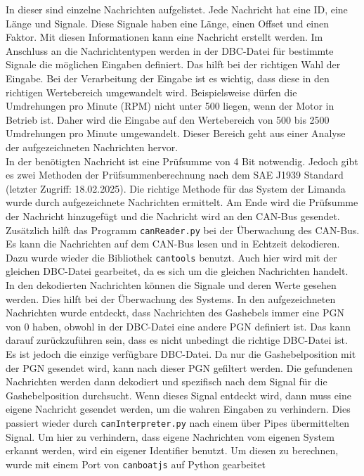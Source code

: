 In dieser sind einzelne Nachrichten aufgelistet. Jede Nachricht hat eine ID, eine Länge und Signale. Diese Signale
haben eine Länge, einen Offset und einen Faktor. Mit diesen Informationen kann eine Nachricht erstellt werden.
Im Anschluss an die Nachrichtentypen werden in der DBC-Datei für bestimmte Signale die möglichen Eingaben definiert.
Das hilft bei der richtigen Wahl der Eingabe. 
Bei der Verarbeitung der Eingabe ist es wichtig, dass diese in den richtigen Wertebereich umgewandelt wird.
Beispielsweise dürfen die Umdrehungen pro Minute (RPM) nicht unter 500 liegen, wenn der Motor in Betrieb ist.
Daher wird die Eingabe auf den Wertebereich von 500 bis 2500 Umdrehungen pro Minute umgewandelt. Dieser Bereich
geht aus einer Analyse der aufgezeichneten Nachrichten hervor.
\\
In der benötigten Nachricht ist eine Prüfsumme von 4 Bit notwendig. Jedoch gibt es zwei Methoden der Prüfsummenberechnung
nach dem SAE J1939 Standard \cite{VectorSAE} (letzter Zugriff: 18.02.2025). Die richtige Methode für das System der 
Limanda wurde durch aufgezeichnete Nachrichten ermittelt. Am Ende wird die Prüfsumme der Nachricht hinzugefügt und die
Nachricht wird an den CAN-Bus gesendet. \\
Zusätzlich hilft das Programm \texttt{canReader.py} bei der Überwachung des CAN-Bus. Es kann die Nachrichten auf dem
CAN-Bus lesen und in Echtzeit dekodieren. Dazu wurde wieder die Bibliothek \texttt{cantools} benutzt. Auch hier wird
mit der gleichen DBC-Datei gearbeitet, da es sich um die gleichen Nachrichten handelt. In den dekodierten Nachrichten
können die Signale und deren Werte gesehen werden. Dies hilft bei der Überwachung des Systems. 
In den aufgezeichneten Nachrichten wurde entdeckt, dass Nachrichten des Gashebels
immer eine PGN von 0 haben, obwohl in der DBC-Datei eine andere PGN definiert ist. Das kann darauf zurückzuführen sein, dass
es nicht unbedingt die richtige DBC-Datei ist. Es ist jedoch die einzige verfügbare DBC-Datei. Da nur die Gashebelposition
mit der PGN gesendet wird, kann nach dieser PGN gefiltert werden. Die gefundenen Nachrichten werden dann dekodiert und
spezifisch nach
dem Signal für die Gashebelposition durchsucht. 
Wenn dieses Signal entdeckt wird, dann muss eine eigene Nachricht
gesendet werden, um die wahren Eingaben zu verhindern. Dies passiert wieder durch \texttt{canInterpreter.py} nach 
einem über Pipes übermittelten Signal. Um hier zu verhindern, dass eigene Nachrichten vom eigenen System erkannt werden,
wird ein eigener Identifier benutzt. Um diesen zu berechnen, wurde mit einem Port von \texttt{canboatjs} auf Python gearbeitet 
